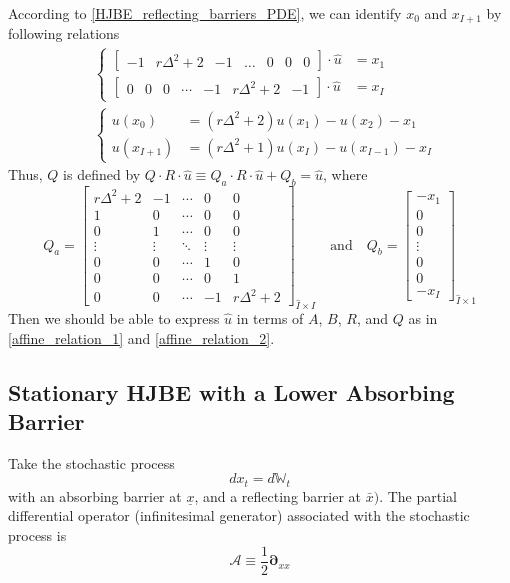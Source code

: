 \documentclass[11pt]{article}
\newcommand{\D}[1][]{\ensuremath{\boldsymbol{\partial}_{#1}}}
\newcommand{\W}{\ensuremath{\mathbb{W}}}
\newcommand{\A}{\ensuremath{\mathcal{A}}}
\begin{document}
According to \eqref{HJBE_reflecting_barriers_PDE}, we can identify $x_0$ and $x_{I+1}$ by following relations
\begin{align}
&\begin{cases}
\begin{bmatrix}
-1&r\Delta^2+2&-1&\dots&0&0&0
\end{bmatrix}\cdot \hat{u} &= x_1
\\[.25cm]
\begin{bmatrix}
0&0&0&\cdots&-1&r\Delta^2+2&-1
\end{bmatrix}\cdot \hat{u}& = x_I
\end{cases}\\
&\begin{cases}
u(x_0) &= (r\Delta^2+2)u(x_1)-u(x_2) - x_1\\
u(x_{I+1})&=(r\Delta^2+1)u(x_I)-u(x_{I -1})-x_I
\end{cases}
\end{align}
Thus, $Q$ is defined by $Q\cdot R\cdot\hat{u}\equiv Q_a\cdot R\cdot\hat{u}+Q_b = \hat{u}$, where
\begin{equation}
Q_a = \begin{bmatrix}
r\Delta^2+2&-1&\cdots&0&0\\
1&0&\cdots&0&0\\
0&1&\cdots&0&0\\
\vdots&\vdots&\ddots&\vdots&\vdots\\
0&0&\cdots&1&0\\
0&0&\cdots&0&1\\
0&0&\cdots&-1&r\Delta^2+2
\end{bmatrix}_{\hat{I}\times I}\quad\text{and}\quad Q_b = \begin{bmatrix}
-x_1\\
0\\
0\\
\vdots\\
0\\
0\\
-x_{I}
\end{bmatrix}_{\hat{I}\times 1}
\end{equation}
Then we should be able to express $\hat{u}$ in terms of $A$, $B$, $R$, and $Q$ as in \eqref{affine_relation_1} and \eqref{affine_relation_2}.

\subsection{Stationary HJBE with a Lower Absorbing Barrier}
Take the stochastic process
$$
d x_t = d \W_t
$$
with an absorbing barrier at $\underline{x}$, and a reflecting barrier at $\bar{x})$.  The partial differential operator (infinitesimal generator) associated with the stochastic process is
$$
\A \equiv \frac{1}{2}\D[xx]
$$
\end{document}
